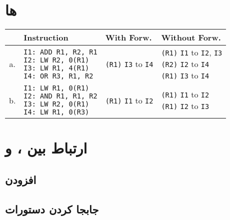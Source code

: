 \documentclass[11pt, dvipsnames, svgnames, x11names]{article}
\begin{document}
\section{ها}

\begin{latin}
\begin{table}[H]
\begin{adjustbox}{width=\textwidth}
\begin{tabular}{|c|l|l|l|}
\hline
& Instruction & With Forw. & Without Forw.\\
\hline
a. &
\makecell[l]{
\texttt{I1: ADD R1, R2, R1} \\ 
\texttt{I2: LW R2, 0(R1)} \\ 
\texttt{I3: LW R1, 4(R1)} \\
\texttt{I4: OR R3, R1, R2}} &
\texttt{(R1)} \texttt{I3} to \texttt{I4}&
\makecell[l]{
\texttt{(R1)} \texttt{I1} to \texttt{I2}, \texttt{I3} \\
\texttt{(R2)} \texttt{I2} to \texttt{I4} \\
\texttt{(R1)} \texttt{I3} to \texttt{I4} 
}\\ 
\hline
b. &
\makecell[l]{
\texttt{I1: LW R1, 0(R1)} \\ 
\texttt{I2: AND R1, R1, R2} \\ 
\texttt{I3: LW R2, 0(R1)} \\
\texttt{I4: LW R1, 0(R3)}} &
\texttt{(R1)} \texttt{I1} to \texttt{I2}&
\makecell[l]{
\texttt{(R1)} \texttt{I1} to \texttt{I2} \\
\texttt{(R1)} \texttt{I2} to \texttt{I3} 
}\\
\hline
\end{tabular}
\end{adjustbox}
\end{table}
\end{latin}

\section{ارتباط بین ،  و }
\subsection{افزودن }
\subsection{جابجا کردن دستورات}
\end{document}
